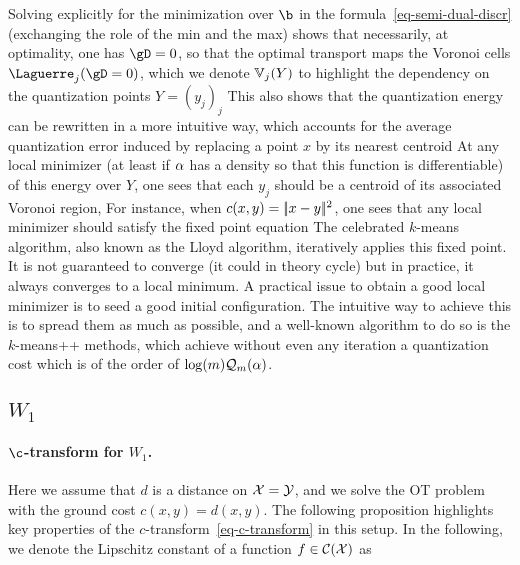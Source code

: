  
Solving explicitly for the minimization over $\b$ in the formula~\eqref{eq-semi-dual-discr} (exchanging the role of the min and the max) shows that necessarily, at optimality, one has $\gD=0$, so that the optimal transport maps the Voronoi cells $\Laguerre_{j}(\gD=0)$, which we denote $\mathbb{V}_j(Y)$ to highlight the dependency on the quantization points $Y=(y_j)_j$
This also shows that the quantization energy can be rewritten in a more intuitive way, which accounts for the average quantization error induced by replacing a point $x$ by its nearest centroid
At any local minimizer (at least if $\alpha$ has a density so that this function is differentiable) of this energy over $Y$, one sees that each $y_j$ should be a centroid of its associated Voronoi region, 
For instance, when $c(x,y)=|\!| x-y |\!|^2$, one sees that any local minimizer should satisfy the fixed point equation
The celebrated $k$-means algorithm, also known as the Lloyd algorithm, iteratively applies this fixed point. It is not guaranteed to converge (it could in theory cycle) but in practice, it always converges to a local minimum. 
%
A practical issue to obtain a good local minimizer is to seed a good initial configuration. The intuitive way to achieve this is to spread them as much as possible, and a well-known algorithm to do so is the $k$-means++ methods, which achieve without even any iteration a quantization cost which is of the order of $\log(m) \mathcal{Q}_m(\alpha)$.  
 

\subsection{$W_1$}
\label{sec-W1}

\paragraph{$\c$-transform for $W_1$.}

Here we assume that $d$ is a distance on $\mathcal{X}=\mathcal{Y}$, and we solve the OT problem with the ground cost $c(x,y)=d(x,y)$. The following proposition highlights key properties of the $c$-transform~\eqref{eq-c-transform} in this setup. In the following, we denote the Lipschitz constant of a function $f \in \mathcal{C}(\mathcal{X})$ as

